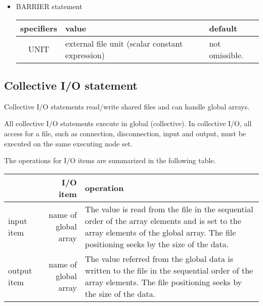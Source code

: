    \begin{itemize}
     \item BARRIER statement

   \begin{table}[h]
    \begin{center}
     \label{tb:globalopen}
     \begin{tabular}{|c||p{90mm}|l|}
       \hline
       specifiers & value & default \\ \hline \hline
       UNIT & external file unit (scalar constant expression)
       & not omissible. \\ \hline
     \end{tabular}
    \end{center}
   \end{table}

   \end{itemize}

   
   \subsection{Collective I/O statement}

   Collective I/O statements read/write shared files and can handle global arrays.

   All collective I/O statements execute in global (collective).
   In collective I/O, all access for a file, such as connection, disconnection,
   input and output, must be executed on the same executing node set. 
   
   The operations for I/O items are summarized in the following table.

   \begin{table}[h]
    \begin{center}
     \begin{tabular}{|l|r|p{80mm}|}
      \hline
      \multicolumn{1}{|c}{ }  & {\bf I/O item} & {\bf operation} \\ \hline
      input item & name of global array & The value is read from the file in the sequential order of the array elements and is set to the array elements of the global array.
      The file positioning seeks by the size of the data.
      \\ \hline
      output item & name of global array & The value referred from the global data 
	      is written to the file in the sequential order of the array elements.
	      The file positioning seeks by the size of the data.
      \\ \hline
      \end{tabular}
     \end{center}
    \label{tb:aaa}
   \end{table}


